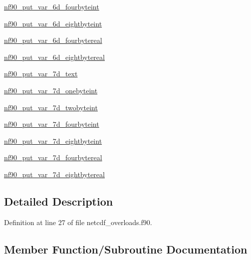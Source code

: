 \begin{DoxyCompactItemize}
\item 
\hyperlink{interfacenf90__put__var_ac2b4088cad2d18c3029ad8eab21c8c40}{nf90\+\_\+put\+\_\+var\+\_\+6d\+\_\+fourbyteint}
\item 
\hyperlink{interfacenf90__put__var_a6154c0d3046f537debf02b81f434e8ca}{nf90\+\_\+put\+\_\+var\+\_\+6d\+\_\+eightbyteint}
\item 
\hyperlink{interfacenf90__put__var_a2184179f0681ab06417d00ba9ec833cd}{nf90\+\_\+put\+\_\+var\+\_\+6d\+\_\+fourbytereal}
\item 
\hyperlink{interfacenf90__put__var_a4069c02c76bcf58084191f04c302d8f9}{nf90\+\_\+put\+\_\+var\+\_\+6d\+\_\+eightbytereal}
\item 
\hyperlink{interfacenf90__put__var_a069a0ca41914caf045b72513b2f0956a}{nf90\+\_\+put\+\_\+var\+\_\+7d\+\_\+text}
\item 
\hyperlink{interfacenf90__put__var_ad1d441a9e3e88b69acc64b7dcc48b08c}{nf90\+\_\+put\+\_\+var\+\_\+7d\+\_\+onebyteint}
\item 
\hyperlink{interfacenf90__put__var_a93a05d133744ad646184d68b0489e4f8}{nf90\+\_\+put\+\_\+var\+\_\+7d\+\_\+twobyteint}
\item 
\hyperlink{interfacenf90__put__var_aa8b372c3cba8f21f07091f495f662ad2}{nf90\+\_\+put\+\_\+var\+\_\+7d\+\_\+fourbyteint}
\item 
\hyperlink{interfacenf90__put__var_acaffd805f996381db0e2c9b959975fa6}{nf90\+\_\+put\+\_\+var\+\_\+7d\+\_\+eightbyteint}
\item 
\hyperlink{interfacenf90__put__var_a42ed096c5cedd60a800fe6f5fdc85433}{nf90\+\_\+put\+\_\+var\+\_\+7d\+\_\+fourbytereal}
\item 
\hyperlink{interfacenf90__put__var_a487b4d4a29c3ca9e9f40edce3400ddfb}{nf90\+\_\+put\+\_\+var\+\_\+7d\+\_\+eightbytereal}
\end{DoxyCompactItemize}


\subsection{Detailed Description}


Definition at line 27 of file netcdf\+\_\+overloads.\+f90.



\subsection{Member Function/\+Subroutine Documentation}
\mbox{\label{interfacenf90__put__var_adf8f3a8ef72d3d7059c66f870f20f306}} 
